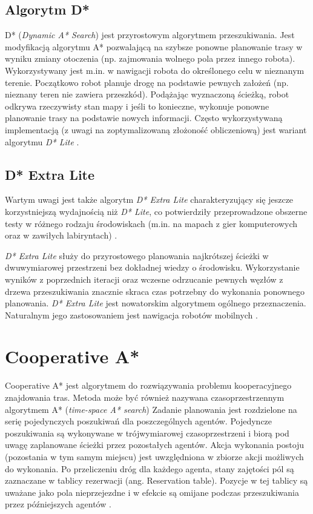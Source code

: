 \subsection{Algorytm D*}
\label{ch:dstar}
D* ({\it Dynamic A* Search}) jest przyrostowym algorytmem przeszukiwania. Jest modyfikacją algorytmu A* pozwalającą na szybsze ponowne planowanie trasy w wyniku zmiany otoczenia (np. zajmowania wolnego pola przez innego robota). Wykorzystywany jest m.in. w nawigacji robota do określonego celu w nieznanym terenie. Początkowo robot planuje drogę na podstawie pewnych założeń (np. nieznany teren nie zawiera przeszkód). Podążając wyznaczoną ścieżką, robot odkrywa rzeczywisty stan mapy i jeśli to konieczne, wykonuje ponowne planowanie trasy na podstawie nowych informacji.
Często wykorzystywaną implementacją (z uwagi na zoptymalizowaną złożoność obliczeniową) jest wariant algorytmu {\it D* Lite} \cite{dstarlite}.

\subsection{D* Extra Lite}
\label{ch:dstarextralite}
Wartym uwagi jest także algorytm {\it D* Extra Lite} charakteryzujący się jeszcze korzystniejszą wydajnością niż {\it D* Lite}, co potwierdziły przeprowadzone obszerne testy w różnego rodzaju środowiskach (m.in. na mapach z gier komputerowych oraz w zawiłych labiryntach) \cite{przybylski}.

{\it D* Extra Lite} służy do przyrostowego planowania najkrótszej ścieżki w dwuwymiarowej przestrzeni bez dokładnej wiedzy o środowisku. Wykorzystanie wyników z poprzednich iteracji oraz wczesne odrzucanie pewnych węzłów z drzewa przeszukiwania znacznie skraca czas potrzebny do wykonania ponownego planowania.
{\it D* Extra Lite} jest nowatorskim algorytmem ogólnego przeznaczenia. Naturalnym jego zastosowaniem jest nawigacja robotów mobilnych \cite{przybylski}.

\section{Cooperative A*}
\label{ch:theory-coop-astar}
Cooperative A* jest algorytmem do rozwiązywania problemu kooperacyjnego znajdowania tras.
Metoda może być również nazywana czasoprzestrzennym algorytmem A* ({\it time-space A* search})
Zadanie planowania jest rozdzielone na serię pojedynczych poszukiwań dla poszczególnych agentów.
Pojedyncze poszukiwania są wykonywane w trójwymiarowej czasoprzestrzeni i biorą pod uwagę zaplanowane ścieżki przez pozostałych agentów.
Akcja wykonania postoju (pozostania w tym samym miejscu) jest uwzględniona w zbiorze akcji możliwych do wykonania.
Po przeliczeniu dróg dla każdego agenta, stany zajętości pól są zaznaczane w tablicy rezerwacji (ang. Reservation table).
Pozycje w tej tablicy są uważane jako pola nieprzejezdne i w efekcie są omijane podczas przeszukiwania przez późniejszych agentów \cite{cooppath}.

